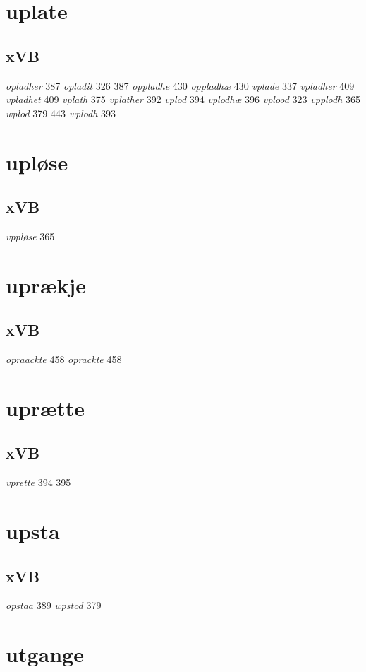 \documentclass[a4paper,twocolumn]{article}
\begin{document}
\section{uplate}
\label{sec:org6e1b70b}
\subsection{xVB}
\label{sec:org1a92872}
\emph{opladher} 387 \emph{opladit} 326 387 \emph{oppladhe} 430 \emph{oppladhæ} 430 \emph{vplade} 337 \emph{vpladher} 409 \emph{vpladhet} 409 \emph{vplath} 375 \emph{vplather} 392 \emph{vplod} 394 \emph{vplodhæ} 396 \emph{vplood} 323 \emph{vpplodh} 365 \emph{wplod} 379 443 \emph{wplodh} 393 
\section{upløse}
\label{sec:org27ff9f6}
\subsection{xVB}
\label{sec:org37fe74d}
\emph{vppløse} 365 
\section{uprækje}
\label{sec:org99a505d}
\subsection{xVB}
\label{sec:orgebd40b7}
\emph{opraackte} 458 \emph{oprackte} 458 
\section{uprætte}
\label{sec:orgca87d84}
\subsection{xVB}
\label{sec:orgf26a687}
\emph{vprette} 394 395 
\section{upsta}
\label{sec:orge7aadba}
\subsection{xVB}
\label{sec:org508e87a}
\emph{opstaa} 389 \emph{wpstod} 379 
\section{utgange}
\label{sec:orge601c37}
\end{document}
